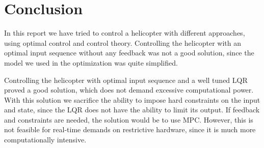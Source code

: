\section{Conclusion}\label{sec:conclusion}
In this report we have tried to control a helicopter with different approaches, using optimal control and control theory. Controlling the helicopter with an optimal input sequence without any feedback was not a good solution, since the model we used in the optimization was quite simplified.

Controlling the helicopter with optimal input sequence and a well tuned LQR proved a good solution, which does not demand excessive computational power. With this solution we sacrifice the ability to impose hard constraints on the input and state, since the LQR does not have the ability to limit its output. If feedback and constraints are needed, the solution would be to use MPC. However, this is not feasible for real-time demands on restrictive hardware, since it is much more computationally intensive.
